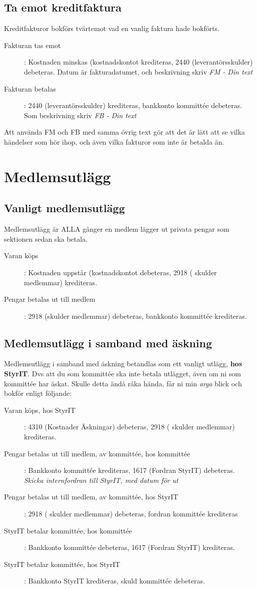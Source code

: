 \documentclass{article}
\begin{document}
\subsection{Ta emot kreditfaktura}
Kreditfakturor bokförs tvärtemot vad en vanlig faktura hade bokförts.
\begin{description}
    \item [Fakturan tas emot]: Kostnaden minskas (kostnadskontot krediteras, 2440 (leverantörsskulder) debeteras. Datum är fakturadatumet, och beskrivning skriv \textit{FM - Din text}
    \item [Fakturan betalas]: 2440 (leverantörsskulder) krediteras, bankkonto kommittée debeteras. Som beskrivning skriv \textit{FB - Din text}
\end{description}
Att använda FM och FB med samma övrig text gör att det är lätt att se vilka händelser som hör ihop, och även vilka fakturor som inte är betalda än.


\section{Medlemsutlägg}
\subsection{Vanligt medlemsutlägg}
Medlemsutlägg är ALLA gånger en medlem lägger ut privata pengar som sektionen sedan ska betala. 
\begin{description}
    \item [Varan köps]: Kostnaden uppstår (kostnadskontot debeteras, 2918 ( skulder medlemmar) krediteras.
    \item [Pengar betalas ut till medlem]: 2918 (skulder medlemmar) debeteras, bankkonto kommittée krediteras.
\end{description}
\subsection{Medlemsutlägg i samband med äskning}
Medlemsutlägg i samband med äskning betandlas som ett vanligt utlägg, \textbf{hos StyrIT}. Dvs att du som kommittée ska inte betala utlägget, även om ni som kommittée har äskat. Skulle detta ändå råka hända, får ni min \textit{arga} blick och bokför enligt följande: 
\begin{description}
    \item [Varan köps, hos StyrIT]: 4310 (Kostnader Äskningar) debeteras, 2918 ( skulder medlemmar) krediteras.
    \item [Pengar betalas ut till medlem, av kommittée, hos kommittée]: Bankkonto kommittée krediteras, 1617 (Fordran StyrIT) debeteras. \textit{Skicka internfordran till StyrIT, med datum för ut}
    \item [Pengar betalas ut till medlem, av kommittée, hos StyrIT]: 2918 ( skulder medlemmar) debeteras, fordran kommittée krediteras
    \item [StyrIT betalar kommittée, hos kommittée] : Bankkonto kommittée debeteras, 1617 (Fordran StyrIT) krediteras.
    \item [StyrIT betalar kommittée, hos StyrIT] : Bankkonto StyrIT krediteras,  skuld kommittée debeteras.
\end{description}
\end{document}
